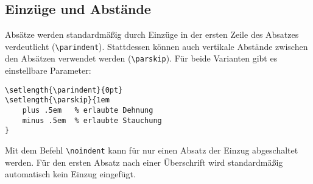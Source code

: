 \subsection*{Einzüge und Abstände} %
\label{sub:einzüge_und_abstände}
Absätze werden standardmäßig durch Einzüge in der ersten Zeile des Absatzes verdeutlicht (\texttt{\textbackslash parindent}). Stattdessen können auch vertikale Abstände zwischen den Absätzen verwendet werden (\texttt{\textbackslash parskip}). Für beide Varianten gibt es einstellbare Parameter:
\begin{verbatim}
\setlength{\parindent}{0pt}
\setlength{\parskip}{1em
    plus .5em   % erlaubte Dehnung
    minus .5em  % erlaubte Stauchung
}
\end{verbatim}
Mit dem Befehl \texttt{\textbackslash noindent} kann für nur einen Absatz der Einzug abgeschaltet werden. Für den ersten Absatz nach einer Überschrift wird standardmäßig automatisch kein Einzug eingefügt.
